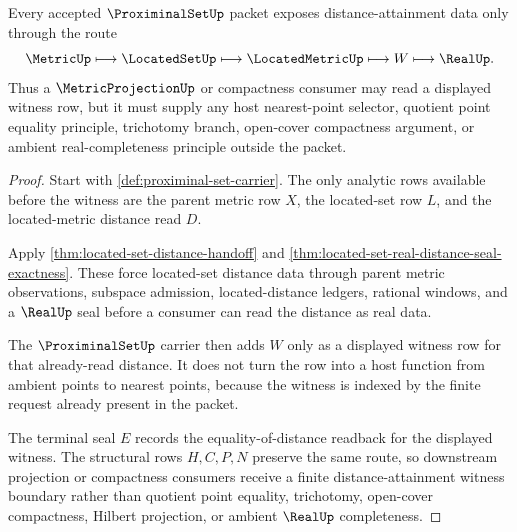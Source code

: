 \begin{theorem}
\label{thm:proximinal-set-distance-witness-route}
Every accepted $\ProximinalSetUp$ packet exposes distance-attainment data only through the route
$$
\MetricUp \longmapsto \LocatedSetUp \longmapsto \LocatedMetricUp \longmapsto W \longmapsto \RealUp .
$$
Thus a $\MetricProjectionUp$ or compactness consumer may read a displayed witness row, but it must supply any host nearest-point selector, quotient point equality principle, trichotomy branch, open-cover compactness argument, or ambient real-completeness principle outside the packet.
\end{theorem}
\begin{proof}
Start with \autoref{def:proximinal-set-carrier}. The only analytic rows available before the witness are the parent metric row $X$, the located-set row $L$, and the located-metric distance read $D$.

Apply \autoref{thm:located-set-distance-handoff} and \autoref{thm:located-set-real-distance-seal-exactness}. These force located-set distance data through parent metric observations, subspace admission, located-distance ledgers, rational windows, and a $\RealUp$ seal before a consumer can read the distance as real data.

The $\ProximinalSetUp$ carrier then adds $W$ only as a displayed witness row for that already-read distance. It does not turn the row into a host function from ambient points to nearest points, because the witness is indexed by the finite request already present in the packet.

The terminal seal $E$ records the equality-of-distance readback for the displayed witness. The structural rows $H,C,P,N$ preserve the same route, so downstream projection or compactness consumers receive a finite distance-attainment witness boundary rather than quotient point equality, trichotomy, open-cover compactness, Hilbert projection, or ambient $\RealUp$ completeness.
\end{proof}



